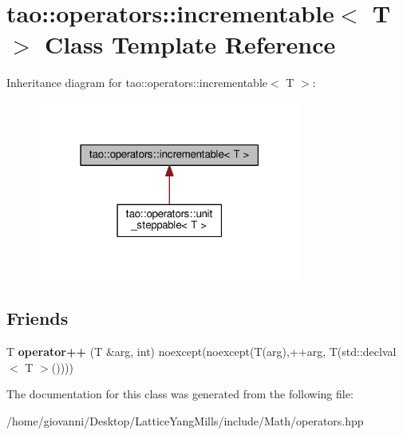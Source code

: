 \hypertarget{classtao_1_1operators_1_1incrementable}{}\section{tao\+:\+:operators\+:\+:incrementable$<$ T $>$ Class Template Reference}
\label{classtao_1_1operators_1_1incrementable}


Inheritance diagram for tao\+:\+:operators\+:\+:incrementable$<$ T $>$\+:\nopagebreak
\begin{figure}[H]
\begin{center}
\leavevmode
\includegraphics[width=247pt]{classtao_1_1operators_1_1incrementable__inherit__graph}
\end{center}
\end{figure}
\subsection*{Friends}
\begin{DoxyCompactItemize}
\item 
T {\bfseries operator++} (T \&arg, int) noexcept(noexcept(T(arg),++arg, T(std\+::declval$<$ T $>$())))\hypertarget{classtao_1_1operators_1_1incrementable_aa5c69dc48411c5d64ccda101d2703895}{}\label{classtao_1_1operators_1_1incrementable_aa5c69dc48411c5d64ccda101d2703895}

\end{DoxyCompactItemize}


The documentation for this class was generated from the following file\+:\begin{DoxyCompactItemize}
\item 
/home/giovanni/\+Desktop/\+Lattice\+Yang\+Mills/include/\+Math/operators.\+hpp\end{DoxyCompactItemize}
